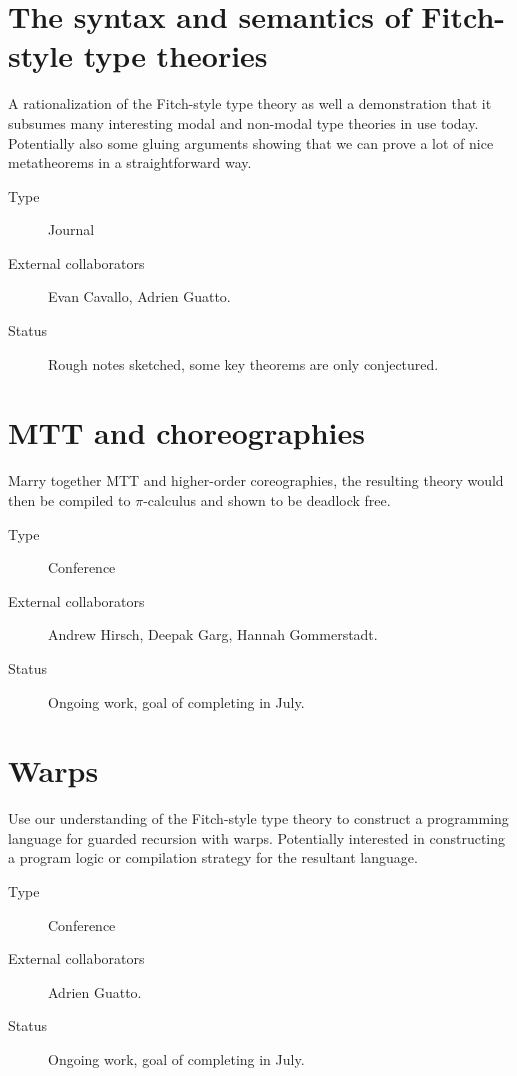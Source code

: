 \documentclass{amsart}
\begin{document}
\section*{The syntax and semantics of Fitch-style type theories}

A rationalization of the Fitch-style type theory as well a demonstration that it subsumes many
interesting modal and non-modal type theories in use today. Potentially also some gluing arguments
showing that we can prove a lot of nice metatheorems in a straightforward way.

\begin{description}
\item[Type] Journal
\item[External collaborators] Evan Cavallo, Adrien Guatto.
\item[Status] Rough notes sketched, some key theorems are only conjectured.
\end{description}

\section*{MTT and choreographies}

Marry together MTT and higher-order coreographies, the resulting theory would then be compiled to
$\pi$-calculus and shown to be deadlock free.

\begin{description}
\item[Type] Conference
\item[External collaborators] Andrew Hirsch, Deepak Garg, Hannah Gommerstadt.
\item[Status] Ongoing work, goal of completing in July.
\end{description}

\section*{Warps}

Use our understanding of the Fitch-style type theory to construct a programming language for guarded
recursion with warps. Potentially interested in constructing a program logic or compilation strategy
for the resultant language.

\begin{description}
\item[Type] Conference
\item[External collaborators] Adrien Guatto.
\item[Status] Ongoing work, goal of completing in July.
\end{description}
\end{document}
